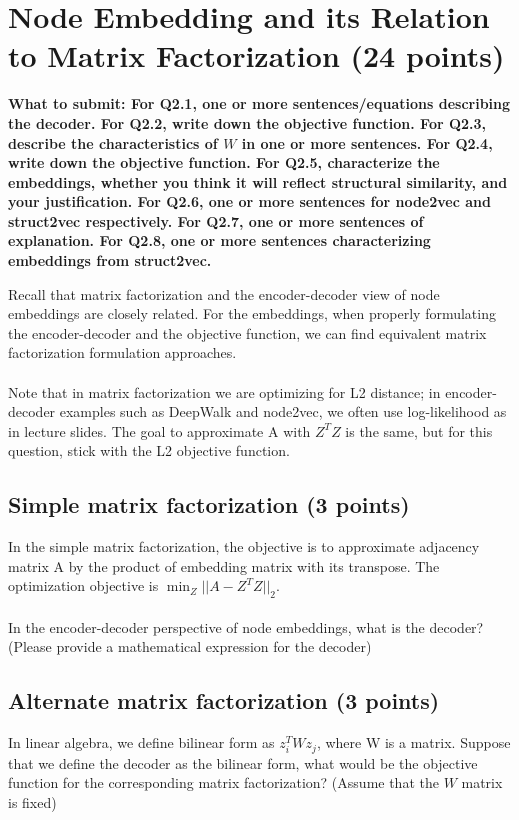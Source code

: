 \section{Node Embedding and its Relation to Matrix Factorization (24 points)}

\textbf{ What to submit: For Q2.1, one or more sentences/equations describing the decoder. For Q2.2, write down the objective function. For Q2.3, describe the characteristics of $W$ in one or more sentences. For Q2.4, write down the objective function. For Q2.5, characterize the embeddings, whether you think it will reflect structural similarity, and your justification. For Q2.6, one or more sentences for node2vec and struct2vec respectively. For Q2.7, one or more sentences of explanation. For Q2.8, one or more sentences characterizing embeddings from struct2vec.}

Recall that matrix factorization and the encoder-decoder view of node embeddings are closely related. For the embeddings, when properly formulating the encoder-decoder and the objective function, we can find equivalent matrix factorization formulation approaches.\\
\\
    Note that in matrix factorization we are optimizing for L2 distance; in encoder-decoder examples such as DeepWalk and node2vec, we often use log-likelihood as in lecture slides. The goal to approximate A with $Z^TZ$ is the same, but for this question, stick with the L2 objective function.
\subsection{Simple matrix factorization (3 points)}
In the simple matrix factorization, the objective is to approximate adjacency matrix A by the product of embedding matrix with its transpose. The optimization objective is $\min_Z ||A - Z^TZ||_2$.\\
\\
In the encoder-decoder perspective of node embeddings, what is the decoder? (Please provide a mathematical expression for the decoder)


\subsection{Alternate matrix factorization (3 points)}
In linear algebra, we define bilinear form as $z_i^T W z_j$, where W is a matrix. Suppose that we define the decoder as the bilinear form, what would be the objective function for the corresponding matrix factorization? (Assume that the $W$ matrix is fixed)

